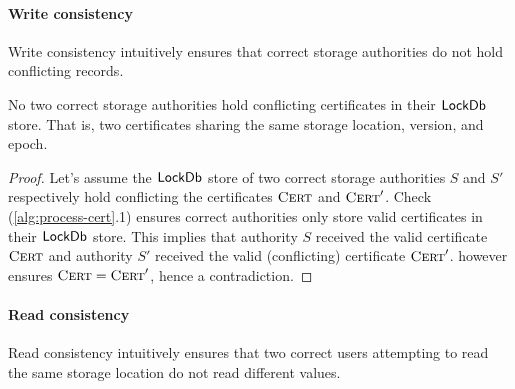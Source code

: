 \paragraph{Write consistency}
Write consistency intuitively ensures that correct storage authorities do not hold conflicting records.

\begin{theorem}
    No two correct storage authorities hold conflicting certificates in their $\textsf{LockDb}$ store. That is, two certificates sharing the same storage location, version, and epoch.
\end{theorem}
\begin{proof}
    Let's assume the $\textsf{LockDb}$ store of two correct storage authorities $S$ and $S'$ respectively hold conflicting the certificates $\textsc{Cert}$ and $\textsc{Cert}'$.
    Check (\ref{alg:process-cert}.1) ensures correct authorities only store valid certificates in their $\textsf{LockDb}$ store. This implies that authority $S$ received the valid certificate $\textsc{Cert}$ and authority $S'$ received the valid (conflicting) certificate $\textsc{Cert}'$.  however ensures $\textsc{Cert} = \textsc{Cert}'$, hence a contradiction.
\end{proof}

\paragraph{Read consistency}
Read consistency intuitively ensures that two correct users attempting to read the same storage location do not read different values.

